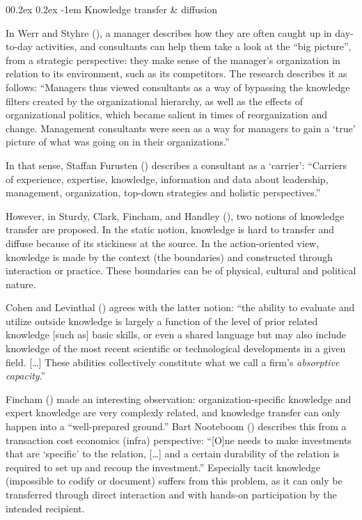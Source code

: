 \documentclass[
  man,floatsintext]{apa6}
\makeatletter
\let\oldparagraph\paragraph
\renewcommand{\paragraph}[1]{\oldparagraph{#1}\mbox{}}
\renewcommand{\paragraph}{\@startsection{paragraph}{4}{\parindent}%
  {0\baselineskip \@plus 0.2ex \@minus 0.2ex}%
  {-1em}%
  {\normalfont\normalsize\bfseries\itshape\typesectitle}}
\makeatother
\begin{document}
\paragraph{Knowledge transfer \& diffusion}\label{knowledge-transfer-diffusion}

In Werr and Styhre (), a manager describes how they are often caught up in day-to-day activities, and consultants can help them take a look at the ``big picture'', from a strategic perspective: they make sense of the manager's organization in relation to its environment, such as its competitors. The research describes it as follows: ``Managers thus viewed consultants as a way of bypassing the knowledge filters created by the organizational hierarchy, as well as the effects of organizational politics, which became salient in times of reorganization and change. Management consultants were seen as a way for managers to gain a `true' picture of what was going on in their organizations.''

In that sense, Staffan Furusten () describes a consultant as a `carrier': ``Carriers of experience, expertise, knowledge, information and data about leadership, management, organization, top-down strategies and holistic perspectives.''

However, in Sturdy, Clark, Fincham, and Handley (), two notions of knowledge transfer are proposed. In the static notion, knowledge is hard to transfer and diffuse because of its stickiness at the source. In the action-oriented view, knowledge is made by the context (the boundaries) and constructed through interaction or practice. These boundaries can be of physical, cultural and political nature.

Cohen and Levinthal () agrees with the latter notion: ``the ability to evaluate and utilize outside knowledge is largely a function of the level of prior related knowledge {[}such as{]} basic skills, or even a shared language but may also include knowledge of the most recent scientific or technological developments in a given field. {[}\ldots{]} These abilities collectively constitute what we call a firm's \emph{absorptive capacity}.''

Fincham () made an interesting observation: organization-specific knowledge and expert knowledge are very complexly related, and knowledge transfer can only happen into a ``well-prepared ground.'' Bart Nooteboom () describes this from a transaction cost economics (infra) perspective: ``{[}O{]}ne needs to make investments that are `specific' to the relation, {[}\ldots{]} and a certain durability of the relation is required to set up and recoup the investment.'' Especially tacit knowledge (impossible to codify or document) suffers from this problem, as it can only be transferred through direct interaction and with hands-on participation by the intended recipient.
\end{document}

